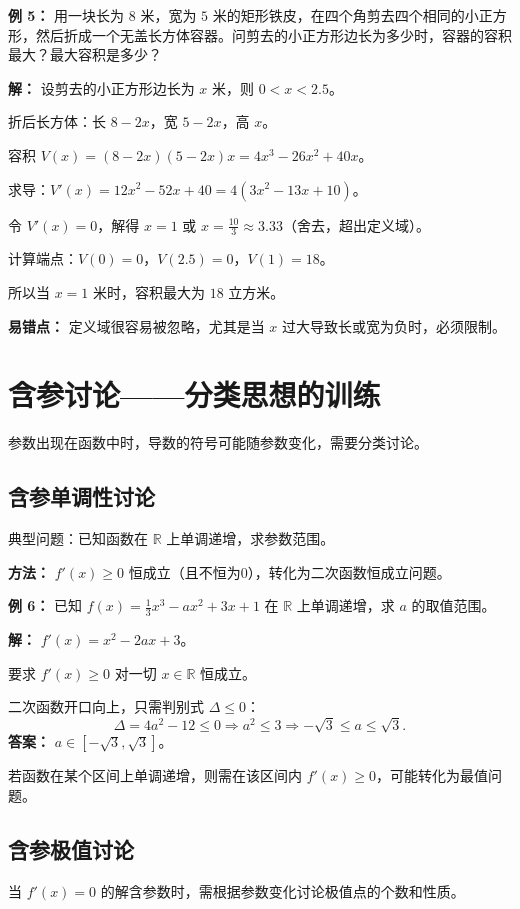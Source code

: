 \documentclass[10pt]{article}
\begin{document}
\textbf{例 5：} 用一块长为 $8$ 米，宽为 $5$ 米的矩形铁皮，在四个角剪去四个相同的小正方形，然后折成一个无盖长方体容器。问剪去的小正方形边长为多少时，容器的容积最大？最大容积是多少？

\textbf{解：} 设剪去的小正方形边长为 $x$ 米，则 $0 < x < 2.5$。

折后长方体：长 $8-2x$，宽 $5-2x$，高 $x$。

容积 $V(x) = (8-2x)(5-2x)x = 4x^3 - 26x^2 + 40x$。

求导：$V'(x)=12x^2-52x+40=4(3x^2-13x+10)$。

令 $V'(x)=0$，解得 $x=1$ 或 $x=\frac{10}{3}\approx3.33$（舍去，超出定义域）。

计算端点：$V(0)=0$，$V(2.5)=0$，$V(1)=18$。

所以当 $x=1$ 米时，容积最大为 $18$ 立方米。

\textbf{易错点：} 定义域很容易被忽略，尤其是当 $x$ 过大导致长或宽为负时，必须限制。

\section{含参讨论——分类思想的训练}
参数出现在函数中时，导数的符号可能随参数变化，需要分类讨论。

\subsection{含参单调性讨论}
典型问题：已知函数在 $\mathbb{R}$ 上单调递增，求参数范围。

\textbf{方法：} $f'(x) \ge 0$ 恒成立（且不恒为0），转化为二次函数恒成立问题。

\textbf{例 6：} 已知 $f(x)=\frac{1}{3}x^3 - a x^2 + 3x + 1$ 在 $\mathbb{R}$ 上单调递增，求 $a$ 的取值范围。

\textbf{解：} $f'(x)=x^2 - 2a x + 3$。

要求 $f'(x) \ge 0$ 对一切 $x\in\mathbb{R}$ 恒成立。

二次函数开口向上，只需判别式 $\Delta \le 0$：
$$\Delta = 4a^2 - 12 \le 0 \Rightarrow a^2 \le 3 \Rightarrow -\sqrt{3} \le a \le \sqrt{3}.$$
\textbf{答案：} $a \in [-\sqrt{3}, \sqrt{3}]$。

若函数在某个区间上单调递增，则需在该区间内 $f'(x) \ge 0$，可能转化为最值问题。

\subsection{含参极值讨论}
当 $f'(x)=0$ 的解含参数时，需根据参数变化讨论极值点的个数和性质。
\end{document}
